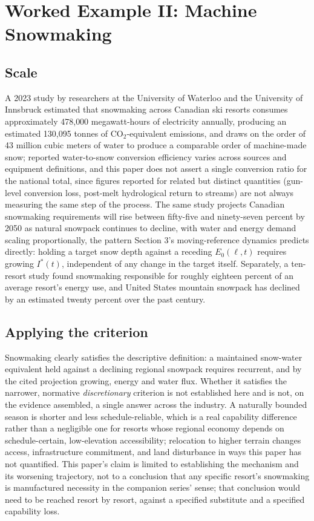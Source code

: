 \documentclass[11pt]{article}
\begin{document}
\section{Worked Example II: Machine Snowmaking}

\subsection{Scale}

A 2023 study by researchers at the University of Waterloo and the University of Innsbruck estimated that snowmaking across Canadian ski resorts consumes approximately 478{,}000 megawatt-hours of electricity annually, producing an estimated 130{,}095 tonnes of CO$_2$-equivalent emissions, and draws on the order of 43 million cubic meters of water to produce a comparable order of machine-made snow; reported water-to-snow conversion efficiency varies across sources and equipment definitions, and this paper does not assert a single conversion ratio for the national total, since figures reported for related but distinct quantities (gun-level conversion loss, post-melt hydrological return to streams) are not always measuring the same step of the process. The same study projects Canadian snowmaking requirements will rise between fifty-five and ninety-seven percent by 2050 as natural snowpack continues to decline, with water and energy demand scaling proportionally, the pattern Section 3's moving-reference dynamics predicts directly: holding a target snow depth against a receding $E_0(\ell,t)$ requires growing $I^{*}(t)$, independent of any change in the target itself. Separately, a ten-resort study found snowmaking responsible for roughly eighteen percent of an average resort's energy use, and United States mountain snowpack has declined by an estimated twenty percent over the past century.

\subsection{Applying the criterion}

Snowmaking clearly satisfies the descriptive definition: a maintained snow-water equivalent held against a declining regional snowpack requires recurrent, and by the cited projection growing, energy and water flux. Whether it satisfies the narrower, normative \emph{discretionary} criterion is not established here and is not, on the evidence assembled, a single answer across the industry. A naturally bounded season is shorter and less schedule-reliable, which is a real capability difference rather than a negligible one for resorts whose regional economy depends on schedule-certain, low-elevation accessibility; relocation to higher terrain changes access, infrastructure commitment, and land disturbance in ways this paper has not quantified. This paper's claim is limited to establishing the mechanism and its worsening trajectory, not to a conclusion that any specific resort's snowmaking is manufactured necessity in the companion series' sense; that conclusion would need to be reached resort by resort, against a specified substitute and a specified capability loss.
\end{document}
